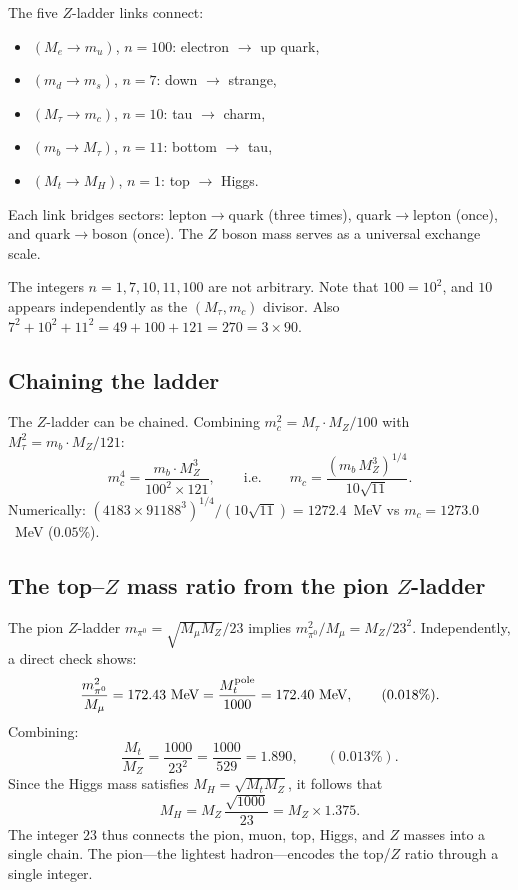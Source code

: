 \documentclass[11pt]{article}
\begin{document}
The five $Z$-ladder links connect:
\begin{itemize}
  \item $(M_e \to m_u)$, $n=100$: electron $\to$ up quark,
  \item $(m_d \to m_s)$, $n=7$: down $\to$ strange,
  \item $(M_\tau \to m_c)$, $n=10$: tau $\to$ charm,
  \item $(m_b \to M_\tau)$, $n=11$: bottom $\to$ tau,
  \item $(M_t \to M_H)$, $n=1$: top $\to$ Higgs.
\end{itemize}
Each link bridges sectors: lepton$\to$quark (three times),
quark$\to$lepton (once), and quark$\to$boson (once).  The
$Z$ boson mass serves as a universal exchange scale.

The integers $n = 1, 7, 10, 11, 100$ are not arbitrary.
Note that $100 = 10^2$, and $10$ appears independently
as the $(M_\tau,m_c)$ divisor.  Also $7^2 + 10^2 + 11^2
= 49 + 100 + 121 = 270 = 3\times 90$.

\subsection{Chaining the ladder}

The $Z$-ladder can be chained.  Combining
$m_c^2 = M_\tau \cdot M_Z / 100$ with
$M_\tau^2 = m_b \cdot M_Z / 121$:
\begin{equation}
  m_c^4 = \frac{m_b \cdot M_Z^3}{100^2 \times 121},
  \qquad\text{i.e.}\qquad
  m_c = \frac{(m_b\,M_Z^3)^{1/4}}{10\sqrt{11}}.
\end{equation}
Numerically: $(4183\times 91188^3)^{1/4}/(10\sqrt{11})
= 1272.4$~MeV vs $m_c = 1273.0$~MeV ($0.05\%$).

\subsection{The top--$Z$ mass ratio from the pion $Z$-ladder}

The pion $Z$-ladder $m_{\pi^0} = \sqrt{M_\mu M_Z}/23$
implies $m_{\pi^0}^2/M_\mu = M_Z/23^2$.  Independently,
a direct check shows:
\begin{equation}
  \frac{m_{\pi^0}^2}{M_\mu} = 172.43~\text{MeV}
  = \frac{M_t^{\rm pole}}{1000} = 172.40~\text{MeV},
  \qquad (0.018\%).
\end{equation}
Combining:
\begin{equation}
  \boxed{\frac{M_t}{M_Z} = \frac{1000}{23^2}
  = \frac{1000}{529} = 1.890,
  \qquad (0.013\%).}
  \label{eq:top-Z-ratio}
\end{equation}
Since the Higgs mass satisfies $M_H = \sqrt{M_t M_Z}$,
it follows that
\begin{equation}
  M_H = M_Z\,\frac{\sqrt{1000}}{23}
  = M_Z\times 1.375.
\end{equation}
The integer $23$ thus connects the pion, muon, top, Higgs,
and $Z$ masses into a single chain.  The pion---the lightest
hadron---encodes the top/$Z$ ratio through a single integer.
\end{document}
